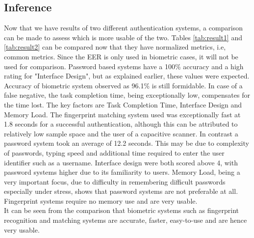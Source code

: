 \subsection{Inference}
Now that we have results of two different authentication systems, a comparison can be made to assess which is more usable of the two. Tables \ref{tab:result1} and \ref{tab:result2} can be compared now that they have normalized metrics, i.e, common metrics. Since the EER is only used in biometric cases, it will not be used for comparison. Password based systems have a 100\% accuracy and a high rating for "Interface Design", but as explained earlier, these values were expected. Accuracy of biometric system observed as 96.1\% is still formidable. In case of a false negative, the task completion time, being exceptionally low, compensates for the time lost. The key factors are Task Completion Time, Interface Design and Memory Load. The fingerprint matching system used was exceptionally fast at 1.8 seconds for a successful authentication, although this can be attributed to relatively low sample space and the user of a capacitive scanner. In contrast a password system took an average of 12.2 seconds. This may be due to complexity of passwords, typing speed and additional time required to enter the user identifier such as a username. Interface design were both scored above 4, with password systems higher due to its familiarity to users. Memory Load, being a very important focus, due to difficulty in remembering difficult passwords especially under stress, shows that password systems are not preferable at all. Fingerprint systems require no memory use and are very usable.\\
It can be seen from the comparison that biometric systems such as fingerprint recognition and matching systems are accurate, faster, easy-to-use and are hence very usable. 


